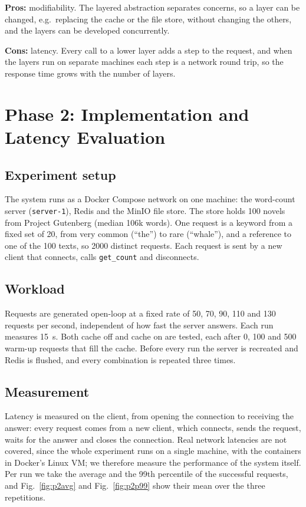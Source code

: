\documentclass[conference,onecolumn]{IEEEtran}
\begin{document}
\noindent\textbf{Pros:} modifiability. The layered abstraction separates concerns, so a layer can be changed, e.g.\ replacing the cache or the file store, without changing the others, and the layers can be developed concurrently.

\noindent\textbf{Cons:} latency. Every call to a lower layer adds a step to the request, and when the layers run on separate machines each step is a network round trip, so the response time grows with the number of layers.

\section{Phase 2: Implementation and Latency Evaluation}

\subsection{Experiment setup}
The system runs as a Docker Compose network on one machine: the word-count server (\texttt{server-1}), Redis and the MinIO file store. The store holds 100 novels from Project Gutenberg (median 106k words). One request is a keyword from a fixed set of 20, from very common (``the'') to rare (``whale''), and a reference to one of the 100 texts, so 2000 distinct requests. Each request is sent by a new client that connects, calls \texttt{get\_count} and disconnects.

\subsection{Workload}
Requests are generated open-loop at a fixed rate of 50, 70, 90, 110 and 130 requests per second, independent of how fast the server answers. Each run measures 15~s. Both cache off and cache on are tested, each after 0, 100 and 500 warm-up requests that fill the cache. Before every run the server is recreated and Redis is flushed, and every combination is repeated three times.

\subsection{Measurement}
Latency is measured on the client, from opening the connection to receiving the answer: every request comes from a new client, which connects, sends the request, waits for the answer and closes the connection. Real network latencies are not covered, since the whole experiment runs on a single machine, with the containers in Docker's Linux VM; we therefore measure the performance of the system itself. Per run we take the average and the 99th percentile of the successful requests, and Fig.~\ref{fig:p2avg} and Fig.~\ref{fig:p2p99} show their mean over the three repetitions.
\end{document}
